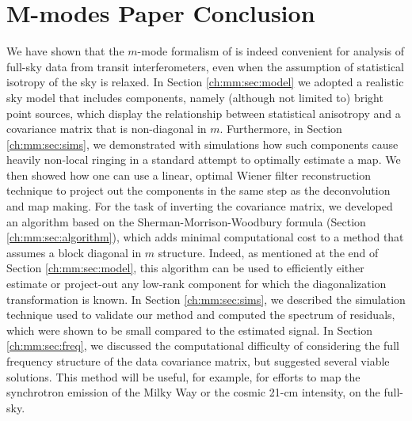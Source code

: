\section{M-modes Paper Conclusion}
\label{ch:conclusion:sec:mmodes}
We have shown that the $m$-mode formalism of \cite{mmodes1, mmodes2} is indeed convenient for analysis of full-sky data from transit interferometers, even when the assumption of statistical isotropy of the sky is relaxed. In Section \ref{ch:mm:sec:model} we adopted a realistic sky model that includes components, namely (although not limited to) bright point sources, which display the relationship between statistical anisotropy and a covariance matrix that is non-diagonal in $m$. Furthermore, in Section \ref{ch:mm:sec:sims}, we demonstrated with simulations how such components cause heavily non-local ringing in a standard attempt to optimally estimate a map. We then showed how one can use a linear, optimal Wiener filter reconstruction technique to project out the components in the same step as the deconvolution and map making. For the task of inverting the covariance matrix, we developed an algorithm based on the Sherman-Morrison-Woodbury formula (Section \ref{ch:mm:sec:algorithm}), which adds minimal computational cost to a method that assumes a block diagonal in $m$ structure. Indeed, as mentioned at the end of Section \ref{ch:mm:sec:model}, this algorithm can be used to efficiently either estimate or project-out any low-rank component for which the diagonalization transformation is known. In Section \ref{ch:mm:sec:sims}, we described the simulation technique used to validate our method and computed the spectrum of residuals, which were shown to be small compared to the estimated signal. In Section \ref{ch:mm:sec:freq}, we discussed the computational difficulty of considering the full frequency structure of the data covariance matrix, but suggested several viable solutions. This method will be useful, for example, for efforts to map the synchrotron emission of the Milky Way or the cosmic 21-cm intensity, on the full-sky.
